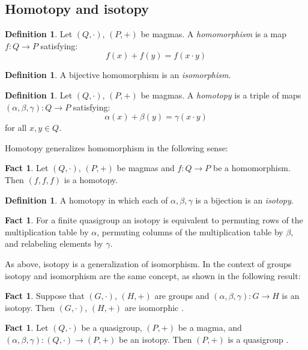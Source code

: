 \documentclass[12pt]{report}
\theoremstyle{definition}
\newtheorem{fct}[thm]{Fact}
\newtheorem{dfn}[thm]{Definition}
\begin{document}
\subsection{Homotopy and isotopy}

\begin{dfn}
  Let $(Q, \cdot)$, $(P, +)$ be magmas. A \emph{homomorphism} is a map $f: Q\to P$ satisfying:
  \[f(x) + f(y) = f(x\cdot y)\]
\end{dfn}

\begin{dfn}
  A bijective homomorphism is an \emph{isomorphism}.
\end{dfn}

\begin{dfn}
  Let $(Q, \cdot)$, $(P, +)$ be magmas. A \emph{homotopy} is a triple of maps $(\alpha, \beta, \gamma): Q\to P$ satisfying: 
  \[\alpha(x) + \beta(y) = \gamma(x\cdot y)\]
  for all $x, y\in Q$.
\end{dfn}

Homotopy generalizes homomorphism in the following sense:

\begin{fct}
Let $(Q, \cdot)$, $(P, +)$ be magmas and $f: Q\to P$ be a homomorphism. Then $(f, f, f)$ is a homotopy.
\end{fct}

\begin{dfn}
  A homotopy in which each of $\alpha, \beta, \gamma$ is a bijection is an \emph{isotopy}.
\end{dfn}

\begin{fct}
  For a finite quasigroup an isotopy is equivalent to permuting rows of the multiplication table by $\alpha$,
    permuting columns of the multiplication table by $\beta$, and relabeling elements by $\gamma$.
\end{fct}

As above, isotopy is a generalization of isomorphism. In the context of groups isotopy and isomorphism are the same
  concept, as shown in the following result: 

\begin{fct}
  Suppose that $(G, \cdot)$, $(H, +)$ are groups and $(\alpha, \beta, \gamma): G\to H$ is an isotopy. Then $(G, \cdot)$,
    $(H, +)$ are isomorphic \cite{Bruck}.
\end{fct}

\begin{fct}
  Let $(Q, \cdot)$ be a quasigroup, $(P, +)$ be a magma, and $(\alpha, \beta, \gamma): (Q, \cdot)\to (P, +)$ be an isotopy.
    Then $(P, +)$ is a quasigroup \cite{Bruck}.
\end{fct}
\end{document}

